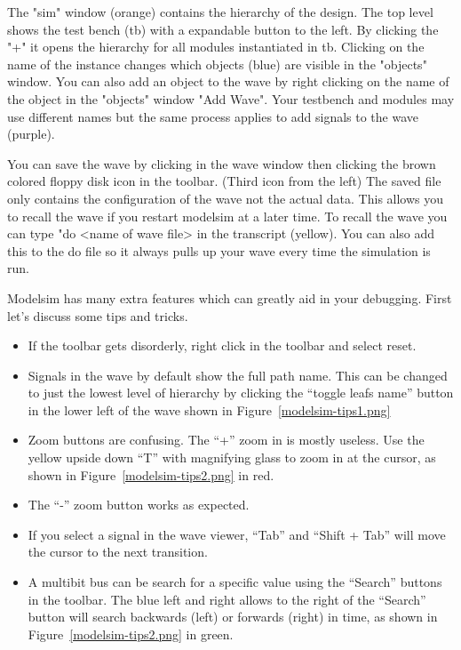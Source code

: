 \documentclass{article}
\begin{document}
The "sim" window (orange) contains the hierarchy of the design.  The
top level shows the test bench (tb) with a expandable button to the
left.
By clicking the "+" it opens the hierarchy for all modules
instantiated in tb.  Clicking on the name of the instance changes
which objects (blue) are visible in the "objects" window.  You can
also add an
object to the wave by right clicking on the name of the object in the
"objects" window "Add Wave".  Your testbench and modules may use
different names but the same process applies to add signals to the
wave (purple).

You can save the wave by clicking in the wave window then clicking the
brown colored floppy disk icon in the toolbar.  (Third icon from the
left)  The saved file only contains the configuration of the wave not
the actual data. This allows you to recall the wave if you restart
modelsim at a later time.  To recall the wave you can type "do <name
of wave file> in the transcript (yellow).  You can also add this to
the do file so it always pulls up your wave every time the simulation
is run.

Modelsim has many extra features which can greatly aid in your debugging.
First let's discuss some tips and tricks.
\begin{itemize}
\item  If the toolbar gets disorderly, right click in the toolbar and
  select reset.
\item Signals in the wave by default show the full path name.  This can
  be changed to just the lowest level of hierarchy by clicking the
  ``toggle leafs name'' button in the lower left of the wave shown in
  Figure~\ref{modelsim-tips1.png}  
\item Zoom buttons are confusing.  The ``+'' zoom in is mostly useless.
  Use the yellow upside down ``T'' with magnifying glass to zoom in
  at the cursor, as shown in Figure~\ref{modelsim-tips2.png} in red.
\item The ``-'' zoom button works as expected.
\item If you select a signal in the wave viewer, ``Tab'' and ``Shift + Tab''
  will move the cursor to the next transition.
\item A multibit bus can be search for a specific value using the ``Search''
  buttons in the toolbar.  The blue left and right allows to the right of
  the ``Search'' button will search backwards (left) or forwards (right)
  in time, as shown in Figure~\ref{modelsim-tips2.png} in green.
\end{itemize}
\end{document}
